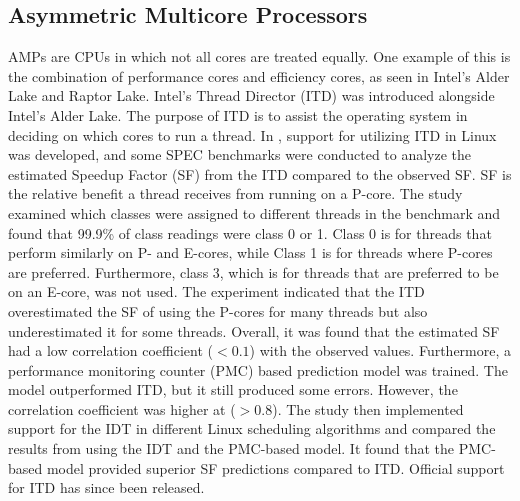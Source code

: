 \subsection{Asymmetric Multicore Processors}
AMPs are CPUs in which not all cores are treated equally. One example of this is the combination of performance cores and efficiency cores, as seen in Intel's Alder Lake and Raptor Lake. Intel's Thread Director (ITD) was introduced alongside Intel's Alder Lake. The purpose of ITD is to assist the operating system in deciding on which cores to run a thread.
In \cite{saez2022evaluation}, support for utilizing ITD in Linux was developed, and some SPEC benchmarks were conducted to analyze the estimated Speedup Factor (SF) from the ITD compared to the observed SF. SF is the relative benefit a thread receives from running on a P-core. The study examined which classes were assigned to different threads in the benchmark and found that 99.9\% of class readings were class 0 or 1. Class 0 is for threads that perform similarly on P- and E-cores, while Class 1 is for threads where P-cores are preferred.\cite{Intel202?whitepaper} Furthermore, class 3, which is for threads that are preferred to be on an E-core, was not used. The experiment indicated that the ITD overestimated the SF of using the P-cores for many threads but also underestimated it for some threads. Overall, it was found that the estimated SF had a low correlation coefficient ($<0.1$) with the observed values. Furthermore, a performance monitoring counter (PMC) based prediction model was trained. The model outperformed ITD, but it still produced some errors. However, the correlation coefficient was higher at ($>0.8$). The study then implemented support for the IDT in different Linux scheduling algorithms and compared the results from using the IDT and the PMC-based model. It found that the PMC-based model provided superior SF predictions compared to ITD.\cite{saez2022evaluation} Official support for ITD has since been released.